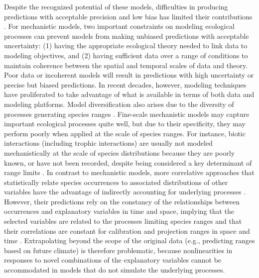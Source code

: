 \documentclass[11pt]{article}
\begin{document}
Despite the recognized potential of these models, difficulties in producing predictions with acceptable precision and low bias has limited their contributions \citep{Guisan2013}.
For mechanistic models, two important constraints on modeling ecological processes can prevent models from making unbiased predictions with acceptable uncertainty: 
(1) having the appropriate ecological theory needed to link data to modeling objectives, and (2) having sufficient data over a range of conditions to maintain coherence between the spatial and temporal scales of data and theory.
Poor data or incoherent models will result in predictions with high uncertainty or precise but biased predictions.
In recent decades, however, modeling techniques have proliferated to take advantage of what is available in terms of both data and modeling platforms.
Model diversification also arises due to the diversity of processes generating species ranges \citep{Boulangeat2012}.
Fine-scale mechanistic models may capture important ecological processes quite well, but due to their specificity, they may perform poorly when applied at the scale of species ranges.
For instance, biotic interactions (including trophic interactions) are usually not modeled mechanistically at the scale of species distributions because they are poorly known, or have not been recorded, despite being considered a key determinant of range limits \citep{Holt2005, Pigot2013}. 
In contrast to mechanistic models, more correlative approaches that statistically relate species occurrences to associated distributions of other variables have the advantage of indirectly accounting for underlying processes \citep{Guisan2000}.
However, their predictions rely on the constancy of the relationships between occurrences and explanatory variables in time and space, implying that the selected variables are related to the processes limiting species ranges and that their correlations are constant for calibration and projection ranges in space and time \citep{Dormann2007}. 
Extrapolating beyond the scope of the original data (e.g., predicting ranges based on future climate) is therefore problematic, because nonlinearities in responses to novel combinations of the explanatory variables cannot be accommodated in models that do not simulate the underlying processes.
\end{document}
